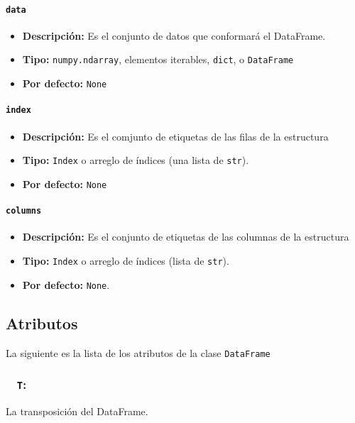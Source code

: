         \paragraph{\texttt{data}}
        \begin{itemize}
            \item \textbf{Descripción:} Es el conjunto de datos que conformará el DataFrame.
            \item \textbf{Tipo:} \texttt{numpy.ndarray}, elementos iterables, \texttt{dict}, o \texttt{DataFrame}
            \item \textbf{Por defecto:} \texttt{None}
        \end{itemize}

        \paragraph{\texttt{index}}
        \begin{itemize}
            \item \textbf{Descripción:} Es el comjunto de etiquetas de las filas de la estructura
            \item     \textbf{Tipo:} \texttt{Index} o arreglo de índices (una lista de \texttt{str}).
            \item     \textbf{Por defecto:} \texttt{None}
        \end{itemize}

        \paragraph{\texttt{columns}}
        \begin{itemize}
            \item \textbf{Descripción:} Es el conjunto de etiquetas de las columnas de la estructura
            \item \textbf{Tipo:} \texttt{Index} o arreglo de índices (lista de \texttt{str}).
            \item \textbf{Por defecto:} \texttt{None}.
        \end{itemize}

        \subsection{Atributos}

        La siguiente es la lista de los atributos de la clase \texttt{DataFrame}

        \subsubsection{~\hspace{2em} \texttt{T}:} La transposición del DataFrame.

